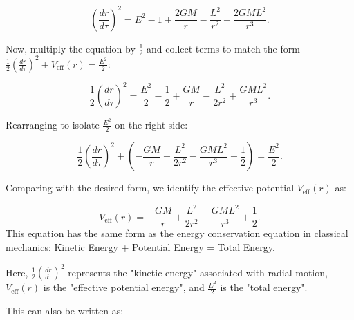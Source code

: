 \begin{equation}
\left( \frac{dr}{d\tau} \right)^2 = E^2 - 1 + \frac{2GM}{r} - \frac{L^2}{r^2} + \frac{2GML^2}{r^3}.
\end{equation}

Now, multiply the equation by $\frac{1}{2}$ and collect terms to match the form $\frac{1}{2}\left(\frac{dr}{d\tau}\right)^2 + V_{\mathrm{eff}}(r) = \frac{E^2}{2}$:

\begin{equation}
\frac{1}{2}\left(\frac{dr}{d\tau}\right)^2 = \frac{E^2}{2} - \frac{1}{2} + \frac{GM}{r} - \frac{L^2}{2r^2} + \frac{GML^2}{r^3}.
\end{equation}

Rearranging to isolate $\frac{E^2}{2}$ on the right side:

\begin{equation}
\frac{1}{2}\left(\frac{dr}{d\tau}\right)^2 + \left(-\frac{GM}{r} + \frac{L^2}{2r^2} - \frac{GML^2}{r^3} + \frac{1}{2} \right) = \frac{E^2}{2}.
\end{equation}

Comparing with the desired form, we identify the effective potential $V_{\mathrm{eff}}(r)$ as:

\begin{equation}
V_{\mathrm{eff}}(r) = -\frac{GM}{r} + \frac{L^2}{2r^2} - \frac{GML^2}{r^3} + \frac{1}{2}.
\end{equation}
This equation has the same form as the energy conservation equation in classical mechanics:
Kinetic Energy + Potential Energy = Total Energy.

Here, $\frac{1}{2}\left(\frac{dr}{d\tau}\right)^2$ represents the "kinetic energy" associated with radial motion, $V_{\mathrm{eff}}(r)$ is the "effective potential energy", and $\frac{E^2}{2}$ is the "total energy".

This can also be written as:

